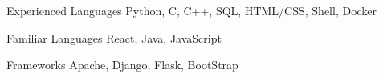 

\begin{cvskills}

  \cvskill
  {Experienced Languages} %
  {Python, C, C++, SQL, HTML/CSS, Shell, Docker} %

  \cvskill
  {Familiar Languages} %
  {React, Java, JavaScript} %

  \cvskill
  {Frameworks} %
  {Apache, Django, Flask, BootStrap} %


\end{cvskills}
